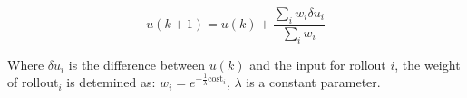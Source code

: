 \begin{equation}
u(k+1)=u(k)+\frac{\sum_{i} w_{i} \delta u_{i}}{\sum_{i} w_{i}}
\label{equation: mppi_weighted_sum}
\end{equation}

Where $\delta u_i$ is the difference between $u(k)$ and the input for rollout $i$, the weight of $\text{rollout}_i$ is detemined as: $w_{i}=e^{-\frac{1}{\lambda} \text{cost}_{i}}$, $\lambda$ is a constant parameter.\bs

%
%
%


